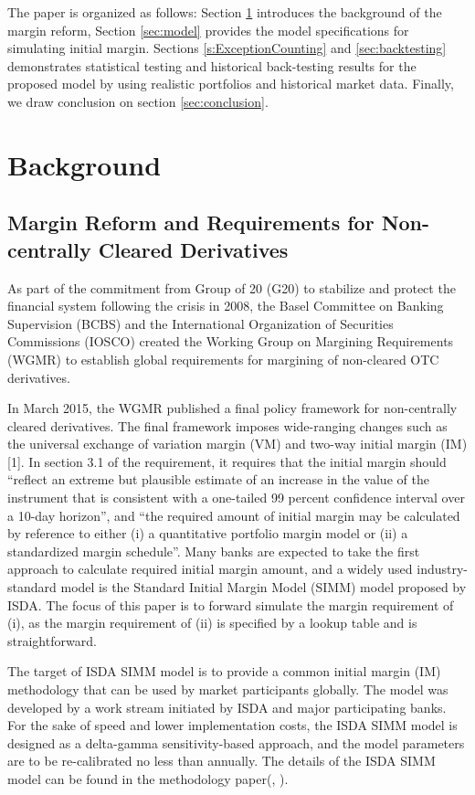 \documentclass[preprint,12pt]{elsarticle}
\begin{document}
The paper is organized as follows: Section \ref{sec:background} introduces the background of the margin reform, Section \ref{sec:model} provides the model specifications for simulating initial margin. Sections \ref{s:ExceptionCounting} and \ref{sec:backtesting} demonstrates statistical testing and historical back-testing results for the proposed model by using realistic portfolios and historical market data. Finally, we draw conclusion on section \ref{sec:conclusion}.

\section{Background} \label{sec:background}

\subsection{Margin Reform and Requirements for Non-centrally Cleared Derivatives}

As part of the commitment from Group of 20 (G20) to stabilize and protect the financial system following the crisis in 2008, the Basel Committee on Banking Supervision (BCBS) and the International Organization of Securities Commissions (IOSCO) created the Working Group on Margining Requirements (WGMR) to establish global requirements for margining of non-cleared OTC derivatives.

In March 2015, the WGMR published a final policy framework for non-centrally cleared derivatives. The final framework imposes wide-ranging changes such as the universal exchange of variation margin (VM) and two-way initial margin (IM) [1]. In section 3.1 of the requirement, it requires that the initial margin should ``reflect an extreme but plausible estimate of an increase in the value of the instrument that is consistent with a one-tailed 99 percent confidence interval over a 10-day horizon'', and ``the required amount of initial margin may be calculated by reference to either (i) a quantitative portfolio margin model or (ii) a standardized margin schedule''. Many banks are expected to take the first approach to calculate required initial margin amount, and a widely used industry-standard model is the Standard Initial Margin Model (SIMM) model proposed by ISDA. The focus of this paper is to forward simulate the margin requirement of (i), as the margin requirement of (ii) is specified by a lookup table and is straightforward.

The target of ISDA SIMM model is to provide a common initial margin (IM) methodology that can be used by market participants globally. The model was developed by a work stream initiated by ISDA and major participating banks. For the sake of speed and lower implementation costs, the ISDA SIMM model is designed as a delta-gamma sensitivity-based approach, and the model parameters are to be re-calibrated no less than annually. The details of the ISDA SIMM model can be found in the methodology paper(\cite{isda_im_method_2016}, \cite{isda_im_cacl_process_2016}).
\end{document}
